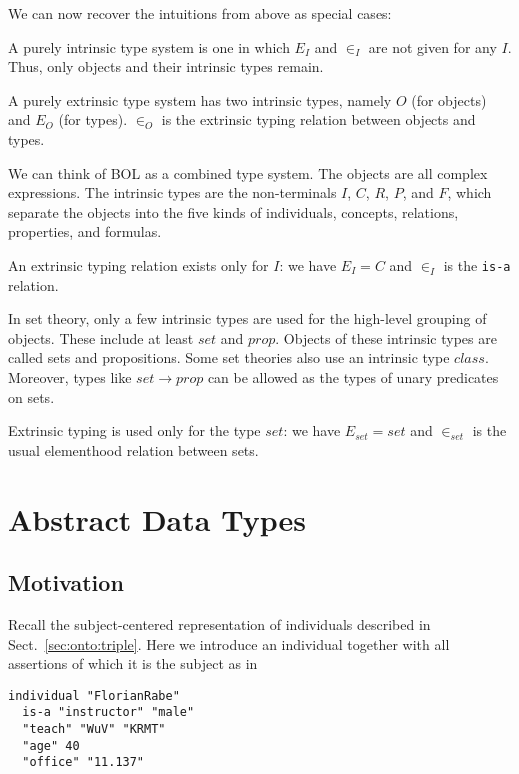 We can now recover the intuitions from above as special cases:
\begin{compactitem}
 \item A purely intrinsic type system is one in which $E_I$ and $\in_I$ are not given for any $I$.
 Thus, only objects and their intrinsic types remain.
 \item A purely extrinsic type system has two intrinsic types, namely $O$ (for objects) and $E_O$ (for types).
 $\in_O$ is the extrinsic typing relation between objects and types.
\end{compactitem}

\begin{example}
We can think of BOL as a combined type system.
The objects are all complex expressions.
The intrinsic types are the non-terminals $I$, $C$, $R$, $P$, and $F$, which separate the objects into the five kinds of individuals, concepts, relations, properties, and formulas.

An extrinsic typing relation exists only for $I$: we have $E_I=C$ and $\in_I$ is the \texttt{is-a} relation.
\end{example}

\begin{example}
In set theory, only a few intrinsic types are used for the high-level grouping of objects.
These include at least $set$ and $prop$.
Objects of these intrinsic types are called sets and propositions.
Some set theories also use an intrinsic type $class$.
Moreover, types like $set\to prop$ can be allowed as the types of unary predicates on sets.

Extrinsic typing is used only for the type $set$: we have $E_{set}=set$ and $\in_{set}$ is the usual elementhood relation between sets.
\end{example}

\section{Abstract Data Types}

\subsection{Motivation}

Recall the subject-centered representation of individuals described in Sect.~\ref{sec:onto:triple}.
Here we introduce an individual together with all assertions of which it is the subject as in
\begin{lstlisting}
individual "FlorianRabe"
  is-a "instructor" "male"
  "teach" "WuV" "KRMT"
  "age" 40
  "office" "11.137"
\end{lstlisting}

